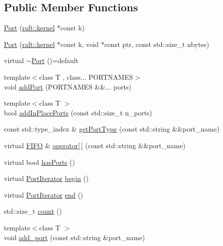 \subsection*{Public Member Functions}
\begin{DoxyCompactItemize}
\item 
\hyperlink{class_port_afa3ede44d69282f75d45e714a590e152}{Port} (\hyperlink{classraft_1_1kernel}{raft\+::kernel} $\ast$const k)
\item 
\hyperlink{class_port_a18a11e3dd9478f802461f857d442cefe}{Port} (\hyperlink{classraft_1_1kernel}{raft\+::kernel} $\ast$const k, void $\ast$const ptr, const std\+::size\+\_\+t nbytes)
\item 
virtual \hyperlink{class_port_abbd27caff9c3587bec4d8211ec16c5d4}{$\sim$\+Port} ()=default
\item 
{\footnotesize template$<$class T , class... P\+O\+R\+T\+N\+A\+M\+ES$>$ }\\void \hyperlink{class_port_a9c1343a48c523fc5b285cb055ba2b53e}{add\+Port} (P\+O\+R\+T\+N\+A\+M\+ES \&\&... ports)
\item 
{\footnotesize template$<$class T $>$ }\\bool \hyperlink{class_port_aaf89e298b9ae64f9c42703c14d9eed0a}{add\+In\+Place\+Ports} (const std\+::size\+\_\+t n\+\_\+ports)
\item 
const std\+::type\+\_\+index \& \hyperlink{class_port_af34969d8f5e17ad29233334526d5b77b}{get\+Port\+Type} (const std\+::string \&\&port\+\_\+name)
\item 
virtual \hyperlink{class_f_i_f_o}{F\+I\+FO} \& \hyperlink{class_port_a08cf165426982d83e5a191ba74cc6e5d}{operator\mbox{[}$\,$\mbox{]}} (const std\+::string \&\&port\+\_\+name)
\item 
virtual bool \hyperlink{class_port_a7042f5b5c2ab14c9591a4984811a6012}{has\+Ports} ()
\item 
virtual \hyperlink{class_port_iterator}{Port\+Iterator} \hyperlink{class_port_abf4d86026b67f6c02db3e3abb0f2e8b4}{begin} ()
\item 
virtual \hyperlink{class_port_iterator}{Port\+Iterator} \hyperlink{class_port_aa85be3fb7734863d482bf002e0f0923d}{end} ()
\item 
std\+::size\+\_\+t \hyperlink{class_port_a33562ea87ac7e83a32441da40cbd9279}{count} ()
\item 
{\footnotesize template$<$class T $>$ }\\void \hyperlink{class_port_a386ae04ad9bfd7302f1a6b9ca8066dcb}{add\+\_\+port} (const std\+::string \&port\+\_\+name)
\end{DoxyCompactItemize}
